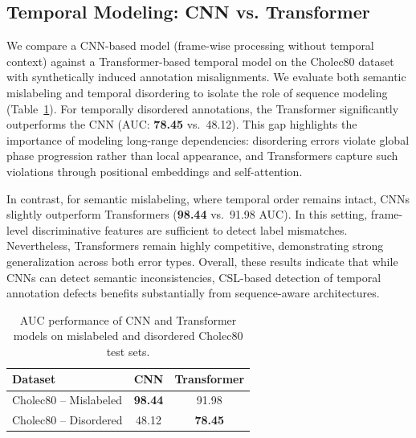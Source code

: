 \documentclass{article}
\theoremstyle{plain}
\theoremstyle{definition}
\theoremstyle{remark}
\begin{document}
\vspace{-0.4em}
\subsection{Temporal Modeling: CNN vs. Transformer}
\vspace{-0.2em}
\label{subsec:ablation_temporal}
We compare a CNN-based model (frame-wise processing without temporal context) against a Transformer-based temporal model on the Cholec80 dataset with synthetically induced annotation misalignments. We evaluate both semantic mislabeling and temporal disordering to isolate the role of sequence modeling (Table~\ref{tab:CNN_vs_transformers}).
For temporally disordered annotations, the Transformer significantly outperforms the CNN (AUC: \textbf{78.45} vs.\ 48.12). This gap highlights the importance of modeling long-range dependencies: disordering errors violate global phase progression rather than local appearance, and Transformers capture such violations through positional embeddings and self-attention.

In contrast, for semantic mislabeling, where temporal order remains intact, CNNs slightly outperform Transformers (\textbf{98.44} vs.\ 91.98 AUC). In this setting, frame-level discriminative features are sufficient to detect label mismatches. Nevertheless, Transformers remain highly competitive, demonstrating strong generalization across both error types.
Overall, these results indicate that while CNNs can detect semantic inconsistencies, CSL-based detection of temporal annotation defects benefits substantially from sequence-aware architectures.

\begin{table}[!ht]
\centering
\vspace{-0.5em}
\caption{AUC performance of CNN and Transformer models on mislabeled and disordered Cholec80 test sets.}
\label{tab:CNN_vs_transformers}
\begin{tabular}{lcc}
\toprule[1.5pt]
\textbf{Dataset} & \textbf{CNN} & \textbf{Transformer} \\
\midrule[1pt]
Cholec80 -- Mislabeled 
& \cellcolor[gray]{0.9}\textbf{98.44} 
& 91.98 \\
Cholec80 -- Disordered 
& 48.12 
& \cellcolor[gray]{0.9}\textbf{78.45} \\
\bottomrule[1.5pt]
\end{tabular}
\vspace{-0.8em}
\end{table}
\end{document}
